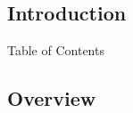 \subsection{Introduction}
\begin{frame}[shrink]{Table of Contents}
    \tableofcontents
\end{frame}

\subsection{Overview}
\begin{frame}
\end{frame}